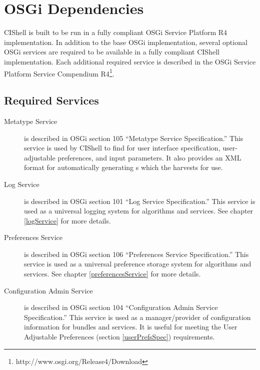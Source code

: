 %

\section{OSGi Dependencies}

CIShell is built to be run in a fully compliant OSGi Service Platform R4
implementation. In addition to the base OSGi implementation, several
optional OSGi services are required to be available in a fully compliant CIShell
implementation. Each additional required service is described in the OSGi
Service Platform Service Compendium
R4\footnote{http://www.osgi.org/Release4/Download}.

\subsection*{Required Services}
\begin{description}
  \item[Metatype Service] is described in OSGi section 105 ``Metatype Service
  Specification.'' This service is used by CIShell to find
   for user interface specification, user-adjustable
  preferences, and input parameters. It also provides an XML format for
  automatically generating s which the 
   harvests for use.
  \item[Log Service] is described in OSGi section 101 ``Log Service 
  Specification.'' This service is used as a universal logging system for 
  algorithms and services. See chapter \ref{logService} for more details.   
  \item[Preferences Service] is described in OSGi section 106 ``Preferences
  Service Specification.'' This service is used as a universal preference
  storage system for algorithms and services. See chapter \ref{preferencesService} for
  more details.
  \item[Configuration Admin Service] is described in OSGi section 104
  ``Configuration Admin Service Specification.'' This service is used as a
  manager/provider of configuration information for bundles and services. It is 
  useful for meeting the User Adjustable Preferences (section
  \ref{userPrefsSpec}) requirements.
\end{description}

